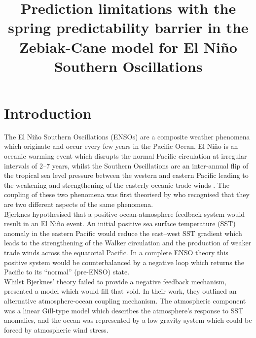 \documentclass[12pt, onecolumn]{revtex4}    %
\begin{document}
                     

\title{Prediction limitations with the spring predictability barrier in the Zebiak-Cane model for El Ni\~{n}o Southern Oscillations} 

\maketitle
\thispagestyle{plain} %

\section{Introduction}
\noindent
The El Ni\~{n}o Southern Oscillations (ENSOs) are a composite weather phenomena which originate and occur every few years in the Pacific Ocean. El Ni\~{n}o is an oceanic warming event which disrupts the normal Pacific circulation at irregular intervals of 2--7 years, whilst the Southern Oscillations are an inter-annual flip of the tropical sea level pressure between the western and eastern Pacific leading to the weakening and strengthening of the easterly oceanic trade winds \citep{wang2017nino}. The coupling of these two phenomena was first theorised by \cite{doi:10.1175/1520-04931969097} who recognised that they are two different aspects of the same phenomena. \\

Bjerknes hypothesised that a positive ocean-atmosphere feedback system would result in an El Ni\~{n}o event. An initial positive sea surface temperature (SST) anomaly in the eastern Pacific would reduce the east--west SST gradient which leads to the strengthening of the Walker circulation and the production of weaker trade winds across the equatorial Pacific. In a complete ENSO theory this positive system would be counterbalanced by a negative loop which returns the Pacific to its ``normal'' (pre-ENSO) state. \\

Whilst Bjerknes' theory failed to provide a negative feedback mechanism, \cite{Zebiak:1987aa} presented a model which would fill that void. In their work, they outlined an alternative atmosphere-ocean coupling mechanism. The atmospheric component was a linear Gill-type model \citep{Gill:1980aa} which describes the atmosphere's response to SST anomalies, and the ocean was represented by a low-gravity system which could be forced by atmospheric wind stress. \\
\end{document}
